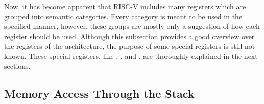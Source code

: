 Now, it has become apparent that RISC-V includes many registers which are grouped into semantic categories.
Every category is meant to be used in the specified manner, however, these groups are mostly only a suggestion of how each register should be used.
Although this subsection provides a good overview over the registers of the architecture, the purpose of some special registers is still not known.
These special registers, like , , and , are thoroughly explained in the next sections.

\subsection{Memory Access Through the Stack}\label{sec:riscv_stack}

%
%
%


\newcommand{\cellptrA}[1]{
	\draw[<-,line width=0.7pt] (0.1,\value{cellnb}) +(2,\value{ptrnb}*0.1) -- +(3.4,\value{ptrnb}*0.75);
	\draw (3.5,\value{ptrnb}*0.8+\value{cellnb}) node[anchor=west] {#1};
	\addtocounter{ptrnb}{1}
}

